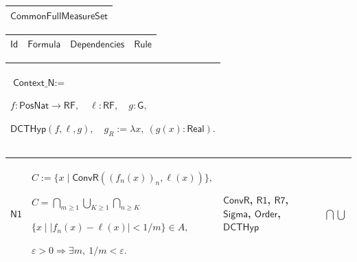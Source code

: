 \documentclass[11pt]{amsart}
\renewcommand{\arraystretch}{1.4}
\newlength{\FTCOneColumnBody}
\newlength{\FTCFourColumnBody}
\begin{document}
{\centering
\renewcommand{\arraystretch}{1.4}
\par\setlength{\parskip}{0pt}\nointerlineskip
\noindent
\begin{tabular}{|@{}>{\centering\arraybackslash}m{\FTCOneColumnBody}|}\hline
$\displaystyle \textsf{CommonFullMeasureSet}$\\ \hline
\end{tabular}%
\par\setlength{\parskip}{0pt}\nointerlineskip
\noindent
\begin{tabular}{|@{}>{\centering\arraybackslash}m{0.078431\FTCFourColumnBody}|>{\centering\arraybackslash}m{0.535947\FTCFourColumnBody}|>{\centering\arraybackslash}m{0.281045\FTCFourColumnBody}|>{\centering\arraybackslash}m{0.104575\FTCFourColumnBody}|}\hline
$\displaystyle \textsf{Id}$ & $\displaystyle \textsf{Formula}$ & $\displaystyle \textsf{Dependencies}$ & $\displaystyle \textsf{Rule}$\\ \hline
\end{tabular}%
\par\setlength{\parskip}{0pt}\nointerlineskip
\noindent
\begin{tabular}{|@{}>{\centering\arraybackslash}m{\FTCOneColumnBody}|}\hline
$\displaystyle \textsf{Context\_N}:=$\par
$\displaystyle f:\textsf{PosNat}\to\textsf{RF},\quad\ell:\textsf{RF},\quad g:\textsf{G},$\par
$\displaystyle \textsf{DCTHyp}(f,\ell,g),\quad g_R:=\lambda x,\ (g(x):\textsf{Real}).$\\ \hline
\end{tabular}%
\par\setlength{\parskip}{0pt}\nointerlineskip
\noindent
\begin{tabular}{|@{}>{\centering\arraybackslash}m{0.078431\FTCFourColumnBody}|>{\centering\arraybackslash}m{0.535947\FTCFourColumnBody}|>{\centering\arraybackslash}m{0.281045\FTCFourColumnBody}|>{\centering\arraybackslash}m{0.104575\FTCFourColumnBody}|}\hline
\hypertarget{dct:N1}{$\displaystyle \textsf{N1}$} & $\displaystyle C:=\{x\mid\textsf{ConvR}((f_n(x))_n,\ell(x))\},$\par
$\displaystyle C=\bigcap_{m\ge1}\bigcup_{K\ge1}\bigcap_{n\ge K}$\par
$\displaystyle \{x\mid |f_n(x)-\ell(x)|<1/m\}\in A,$\par
$\displaystyle \varepsilon>0\Rightarrow\exists m,\ 1/m<\varepsilon.$ & \hyperlink{dctdef:ConvR}{$\displaystyle \textsf{ConvR}$}, \hyperlink{dct:R1}{$\displaystyle \textsf{R1}$}, \hyperlink{dct:R7}{$\displaystyle \textsf{R7}$}, \hyperlink{ax:Sigma}{$\displaystyle \textsf{Sigma}$}, \hyperlink{ax:Order}{$\displaystyle \textsf{Order}$}, \hyperlink{dctdef:DCTHyp}{$\displaystyle \textsf{DCTHyp}$} & $\displaystyle \bigcap\bigcup$\\ \hline

\end{tabular}}
\end{document}
